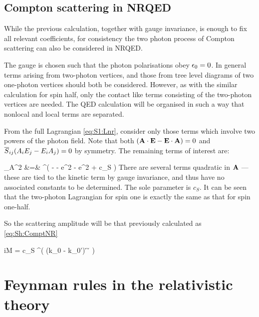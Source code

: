 
\subsection{Compton scattering in NRQED}
While the previous calculation, together with gauge invariance, is enough to fix all relevant coefficients, for consistency the two photon process of Compton scattering can also be considered in NRQED.


The gauge is chosen such that the photon polarisations obey $\epsilon_0 = 0$.  In general terms arising from two-photon vertices, and those from tree level diagrams of two one-photon vertices should both be considered.  However, as with the similar calculation for spin half, only the contact like terms consisting of the two-photon vertices are needed.  The QED calculation will be organised in such a way that nonlocal and local terms are separated. 

From the full Lagrangian \eqref{eq:S1:Lnr}, consider only those terms which involve two powers of the photon field.  Note that both $(\mathbf{A} \cdot \mathbf{E} - \mathbf{E} \cdot \mathbf{A} )=0$ and $\overline{S}_{ij} (A_i E_j - E_i A_j) = 0$ by symmetry.  The remaining terms of interest are:

\scriptsize
\beqa
	_{A^2} &=& \Psi^\dagger ( -   - e^2  - e^2
		+ c_S  ) \Psi
\eeqa
\normalsize
There are several terms quadratic in $\mathbf{A}$ --- these are tied to the kinetic term by gauge invariance, and thus have no associated constants to be determined.  The sole parameter is $c_S$.  It can be seen that the two-photon Lagrangian for spin one is exactly the same as that for spin one-half.  

So the scattering amplitude will be that previously calculated as \eqref{eq:Sh:ComptNR}


\beq
    iM =  c_S  \phi^\dagger  \Big ( (k_0 - k_0')    \v{\A} \times \v{\Adag} \Big ) \phi
\eeq




\section{Feynman rules in the relativistic theory}

